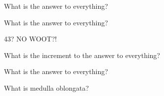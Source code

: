 \documentclass[12pt]{article}
\begin{document}
\begin{myexercise}
	What is the answer to everything?
\end{myexercise}

\begin{myexercise}
	What is the answer to everything?
\end{myexercise}
43?
NO
WOOT?!

\begin{myexercise}[newpage]
	What is the increment to the answer to everything?
\end{myexercise}

\begin{myexercise}
	What is the answer to everything?
\end{myexercise}

What is medulla oblongata?
\printindex
\end{document}
